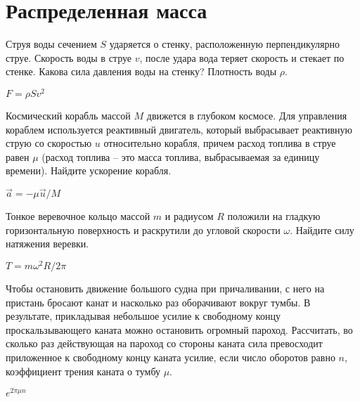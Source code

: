 \section{Распределенная масса}

\begin{ex}
Струя воды сечением $S$ ударяется о стенку, расположенную перпендикулярно струе. Скорость воды в струе $v$, после удара вода теряет скорость и стекает по стенке. Какова сила давления воды на стенку? Плотность воды $\rho$.
\begin{ans}
$F = \rho S v^2$
\end{ans}
\end{ex}

\begin{ex}
Космический корабль массой $M$ движется в глубоком космосе. Для управления кораблем используется реактивный двигатель, который выбрасывает реактивную струю со скоростью $u$ относительно корабля, причем расход топлива в струе равен $\mu$ (расход топлива -- это масса топлива, выбрасываемая за единицу времени). Найдите ускорение корабля.
\begin{ans}
$\vec a = - \mu \vec u / M$
\end{ans}
\end{ex}

\begin{ex}
Тонкое веревочное кольцо массой $m$ и радиусом $R$ положили на гладкую горизонтальную поверхность и раскрутили до угловой скорости $\omega$. Найдите силу натяжения веревки.
\begin{ans}
$T = m\omega^2R/2 \pi$
\end{ans}
\end{ex}

\begin{ex}
Чтобы остановить движение большого судна при причаливании, с него на пристань бросают канат и насколько раз оборачивают вокруг тумбы. В результате, прикладывая небольшое усилие к свободному концу проскальзывающего каната можно остановить огромный пароход. Рассчитать, во сколько раз действующая на пароход со стороны каната сила превосходит приложенное к свободному концу каната усилие, если число оборотов равно $n$, коэффициент трения каната о тумбу $\mu$.
\begin{ans}
$e^{2\pi \mu n}$
\end{ans}
\end{ex}

